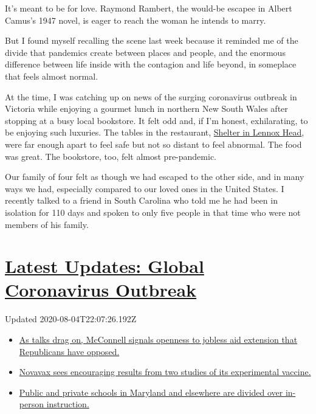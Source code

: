 It's meant to be for love. Raymond Rambert, the would-be escapee in
Albert Camus's 1947 novel, is eager to reach the woman he intends to
marry.

But I found myself recalling the scene last week because it reminded me
of the divide that pandemics create between places and people, and the
enormous difference between life inside with the contagion and life
beyond, in someplace that feels almost normal.

At the time, I was catching up on news of the surging coronavirus
outbreak in Victoria while enjoying a gourmet lunch in northern New
South Wales after stopping at a busy local bookstore. It felt odd and,
if I'm honest, exhilarating, to be enjoying such luxuries. The tables in
the restaurant,
\href{https://www.nytimes3xbfgragh.onion/2018/08/16/dining/restaurants-northern-rivers-byron-bay.html}{Shelter
in Lennox Head}, were far enough apart to feel safe but not so distant
to feel abnormal. The food was great. The bookstore, too, felt almost
pre-pandemic.

Our family of four felt as though we had escaped to the other side, and
in many ways we had, especially compared to our loved ones in the United
States. I recently talked to a friend in South Carolina who told me he
had been in isolation for 110 days and spoken to only five people in
that time who were not members of his family.

\hypertarget{latest-updates-global-coronavirus-outbreak}{%
\section{\texorpdfstring{\href{https://www.nytimes3xbfgragh.onion/2020/08/04/world/coronavirus-cases.html?action=click\&pgtype=Article\&state=default\&region=MAIN_CONTENT_1\&context=storylines_live_updates}{Latest
Updates: Global Coronavirus
Outbreak}}{Latest Updates: Global Coronavirus Outbreak}}\label{latest-updates-global-coronavirus-outbreak}}

Updated 2020-08-04T22:07:26.192Z

\begin{itemize}
\tightlist
\item
  \href{https://www.nytimes3xbfgragh.onion/2020/08/04/world/coronavirus-cases.html?action=click\&pgtype=Article\&state=default\&region=MAIN_CONTENT_1\&context=storylines_live_updates\#link-2daa96b5}{As
  talks drag on, McConnell signals openness to jobless aid extension
  that Republicans have opposed.}
\item
  \href{https://www.nytimes3xbfgragh.onion/2020/08/04/world/coronavirus-cases.html?action=click\&pgtype=Article\&state=default\&region=MAIN_CONTENT_1\&context=storylines_live_updates\#link-1228a480}{Novavax
  sees encouraging results from two studies of its experimental
  vaccine.}
\item
  \href{https://www.nytimes3xbfgragh.onion/2020/08/04/world/coronavirus-cases.html?action=click\&pgtype=Article\&state=default\&region=MAIN_CONTENT_1\&context=storylines_live_updates\#link-4825b93}{Public
  and private schools in Maryland and elsewhere are divided over
  in-person instruction.}
\end{itemize}

